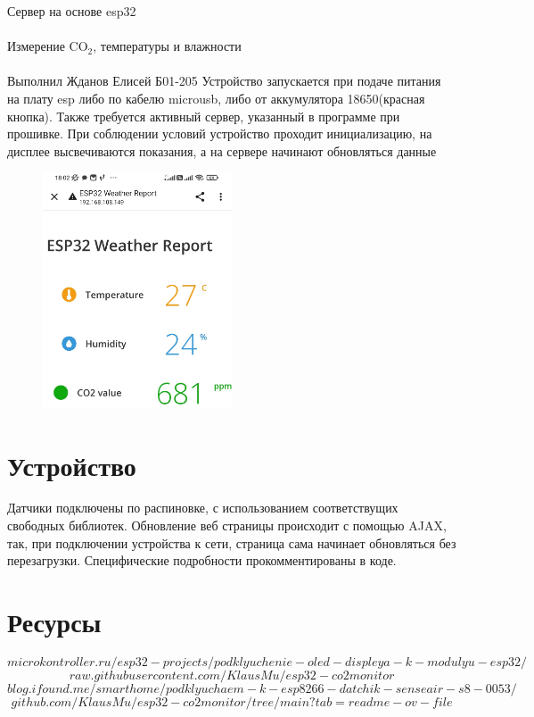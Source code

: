 \documentclass{astroedu-lab}
\begin{document}
\begin{problem}{\huge Сервер на основе esp32\\\\Измерение CO$_2$, температуры и влажности\\\\Выполнил Жданов Елисей Б01-205}
Устройство запускается при подаче питания на плату esp либо по кабелю microusb, либо от аккумулятора 18650(красная кнопка). Также требуется активный сервер, указанный в программе при прошивке. При соблюдении условий устройство проходит инициализацию, на дисплее высвечиваются показания, а на сервере начинают обновляться данные

\begin{figure}[!h]
	\centering
	\includegraphics[width=0.5\textwidth]{ServerScreen.jpg}
	\label{fig:boiler}
\end{figure}

\section{Устройство}

Датчики подключены по распиновке, с использованием соответствущих свободных библиотек. Обновление веб страницы происходит с помощью AJAX, так, при подключении устройства к сети, страница сама начинает обновляться без перезагрузки. Специфические подробности прокомментированы в коде.

\section{Ресурсы}
$$
microkontroller.ru/esp32-projects/podklyuchenie-oled-displeya-k-modulyu-esp32/
$$
$$
raw.githubusercontent.com/KlausMu/esp32-co2monitor
$$
$$
blog.ifound.me/smarthome/podklyuchaem-k-esp8266-datchik-senseair-s8-0053/
$$
$$
github.com/KlausMu/esp32-co2monitor/tree/main?tab=readme-ov-file
$$

\end{problem}
\end{document}
